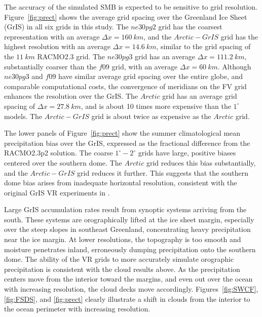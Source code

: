 \documentclass[draft]{agujournal2019}
\begin{document}
The accuracy of the simulated SMB is expected to be sensitive to grid resolution. Figure~\ref{fig:prect} shows the average grid spacing over the Greenland Ice Sheet (GrIS) in all six grids in this study. The $ne30pg2$ grid has the coarsest representation with an average $\Delta x=160~km$, and the $Arctic-GrIS$ grid has the highest resolution with an average $\Delta x=14.6~km$, similar to the grid spacing of the $11~km$ RACMO2.3 grid. The $ne30pg3$ grid has an average $\Delta x=111.2~km$, substantially coarser than the $f09$ grid, with an average $\Delta x=60~km$. Although $ne30pg3$ and $f09$ have similar average grid spacing over the entire globe, and comparable computational costs, the convergence of meridians on the FV grid enhances the resolution over the GrIS. The $Arctic$ grid has an average grid spacing of $\Delta x=27.8~km$, and is about 10 times more expensive than the $1^{\circ}$ models.  The $Arctic-GrIS$ grid is about twice as expensive as the $Arctic$ grid.

The lower panels of Figure~\ref{fig:prect} show the summer climatological mean precipitation bias over the GrIS, expressed as the fractional difference from the RACMO2.3p2 solution. The coarse $1^{\circ}-2^{\circ}$ grids have large, positive biases centered over the southern dome. The $Arctic$ grid reduces this bias substantially, and the $Arctic-GrIS$ grid reduces it further. This suggests that the southern dome bias arises from inadequate horizontal resolution, consistent with the original GrIS VR experiments in . 

Large GrIS accumulation rates result from synoptic systems arriving from the south. These systems are orographically lifted at the ice sheet margin, especially over the steep slopes in southeast Greenland, concentrating heavy precipitation near the ice margin. At lower resolutions, the topography is too smooth and moisture penetrates inland, erroneously dumping precipitation onto the southern dome. The ability of the VR grids to more accurately simulate orographic precipitation is consistent with the cloud results above. As the precipitation centers move from the interior toward the margins, and even out over the ocean with increasing resolution, the cloud decks move accordingly. Figures~\ref{fig:SWCF}, \ref{fig:FSDS}, and \ref{fig:prect} clearly illustrate a shift in clouds from the interior to the ocean perimeter with increasing resolution.
\end{document}
